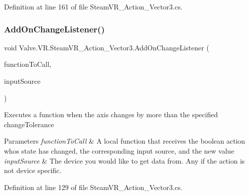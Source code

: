 Definition at line 161 of file Steam\+V\+R\+\_\+\+Action\+\_\+\+Vector3.\+cs.

\mbox{\label{class_valve_1_1_v_r_1_1_steam_v_r___action___vector3_a1a205d38a16267d83ec0e3dcbffa46d7}} 
\subsubsection{\texorpdfstring{AddOnChangeListener()}{AddOnChangeListener()}}
{\footnotesize\ttfamily void Valve.\+V\+R.\+Steam\+V\+R\+\_\+\+Action\+\_\+\+Vector3.\+Add\+On\+Change\+Listener (\begin{DoxyParamCaption}\item[{\mbox{\hyperlink{class_valve_1_1_v_r_1_1_steam_v_r___action___vector3_a78943f89733a1c1a8e12cb4896e65907}{Change\+Handler}}}]{function\+To\+Call,  }\item[{\mbox{\hyperlink{namespace_valve_1_1_v_r_a82e5bf501cc3aa155444ee3f0662853f}{Steam\+V\+R\+\_\+\+Input\+\_\+\+Sources}}}]{input\+Source }\end{DoxyParamCaption})}



Executes a function when the axis changes by more than the specified change\+Tolerance 


\begin{DoxyParams}{Parameters}
{\em function\+To\+Call} & A local function that receives the boolean action who\textquotesingle{}s state has changed, the corresponding input source, and the new value\\
\hline
{\em input\+Source} & The device you would like to get data from. Any if the action is not device specific.\\
\hline
\end{DoxyParams}


Definition at line 129 of file Steam\+V\+R\+\_\+\+Action\+\_\+\+Vector3.\+cs.

\mbox{\label{class_valve_1_1_v_r_1_1_steam_v_r___action___vector3_a05495244778aff42a6d87709c0aa0d55}} 
